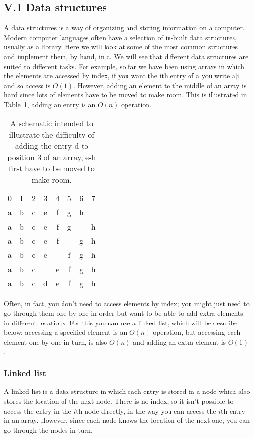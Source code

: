 \documentclass[11pt,a4paper]{scrartcl}
\begin{document}
\subsection*{V.1 Data structures}

A data structures is a way of organizing and storing information on a
computer. Modern computer languages often have a selection of in-built
data structures, usually as a library. Here we will look at some of
the most common structures and implement them, by hand, in c. We will
see that different data structures are suited to different tasks. For
example, so far we have been using arrays in which the elements are
accessed by index, if you want the ith entry of a you write a[i] and
so access is $O(1)$. However, adding an element to the middle of an
array is hard since lots of elements have to be moved to make
room. This is illustrated in Table~\ref{table_reindexing}, adding an
entry is an $O(n)$ operation.

\begin{table}[b]
\begin{tabular}{cccc cccc}
0&1&2&3&4&5&6&7\\
a&b&c&e&f&g&h&\\
a&b&c&e&f&g&&h\\
a&b&c&e&f&&g&h\\
a&b&c&e&&f&g&h\\
a&b&c&&e&f&g&h\\
a&b&c&d&e&f&g&h
\end{tabular}
\caption{A schematic intended to illustrate the difficulty of adding the entry d to position 3 of an array, e-h first have to be moved to make room.\label{table_reindexing}}
\end{table}

Often, in fact, you don't need to access elements by index; you might
just need to go through them one-by-one in order but want to be able
to add extra elements in different locations. For this you can use a
linked list, which will be describe below: accessing a specified
element is an $O(n)$ operation, but accessing each element one-by-one
in turn, is also $O(n)$ and adding an extra element is $O(1)$.

\subsubsection*{Linked list}

A linked list is a data structure in which each entry is stored in a
node which also stores the location of the next node. There is no
index, so it isn't possible to access the entry in the $i$th node
directly, in the way you can access the $i$th entry in an
array. However, since each node knows the location of the next one,
you can go through the nodes in turn. 
\end{document}
